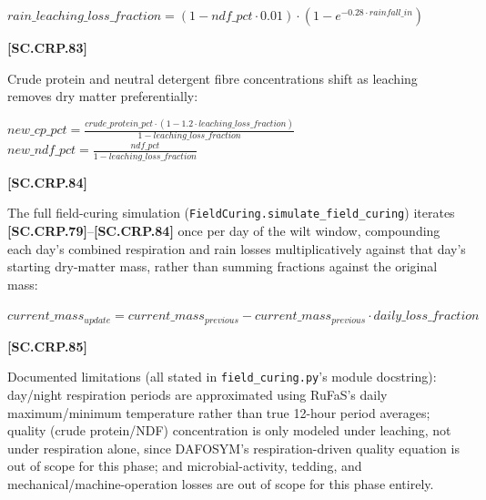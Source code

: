     \begin{center}
        \(rain\_leaching\_loss\_fraction= (1-ndf\_pct \cdot 0.01) \cdot (1-e^{-0.28 \cdot rainfall\_in})\)
    \end{center}
        \vspace{0.5cm}

            {\raggedleft \textbf{[SC.CRP.83]}\par}
            \vspace{0.5cm}

Crude protein and neutral detergent fibre concentrations shift as leaching removes dry matter preferentially:
   \vspace{0.2cm}

    \begin{center}
        \(new\_cp\_pct= \frac{crude\_protein\_pct \cdot (1-1.2 \cdot leaching\_loss\_fraction)}{1-leaching\_loss\_fraction}\)\\
        \(new\_ndf\_pct= \frac{ndf\_pct}{1-leaching\_loss\_fraction}\)
    \end{center}
        \vspace{0.5cm}

            {\raggedleft \textbf{[SC.CRP.84]}\par}
            \vspace{0.5cm}

The full field-curing simulation (\texttt{FieldCuring.simulate\_field\_curing}) iterates \textbf{[SC.CRP.79]}--\textbf{[SC.CRP.84]} once per day of the wilt window, compounding each day's combined respiration and rain losses multiplicatively against that day's starting dry-matter mass, rather than summing fractions against the original mass:
   \vspace{0.2cm}

    \begin{center}
        \(current\_mass_{update}=current\_mass_{previous} - current\_mass_{previous} \cdot daily\_loss\_fraction\)
    \end{center}
        \vspace{0.5cm}

            {\raggedleft \textbf{[SC.CRP.85]}\par}
            \vspace{0.5cm}

Documented limitations (all stated in \texttt{field\_curing.py}'s module docstring): day/night respiration periods are approximated using RuFaS's daily maximum/minimum temperature rather than true 12-hour period averages; quality (crude protein/NDF) concentration is only modeled under leaching, not under respiration alone, since DAFOSYM's respiration-driven quality equation is out of scope for this phase; and microbial-activity, tedding, and mechanical/machine-operation losses are out of scope for this phase entirely.

\begin{refsection}
\label{sec:references-crop-and-soil-module}
\printbibliography[heading=subbibliography,title={References for Crop and Soil Module}]
\end{refsection}

